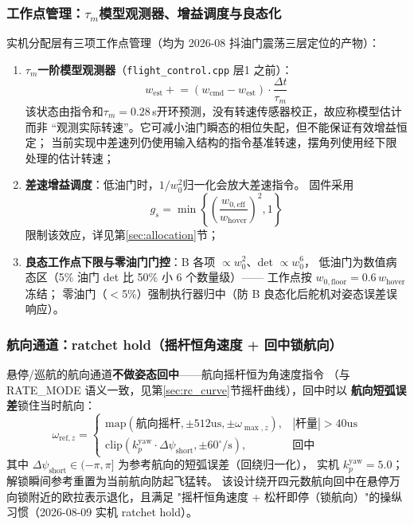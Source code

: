 \subsubsection{工作点管理：$\tau_m$模型观测器、增益调度与良态化}
\label{sec:cascade_workpoint}

实机分配层有三项工作点管理（均为 2026-08 抖油门震荡三层定位的产物）：
\begin{enumerate}[label=(\arabic*)]
    \item \textbf{$\tau_m$一阶模型观测器}（\texttt{flight\_control.cpp} 层1 之前）：
          \begin{equation}
              w_{\mathrm{est}} \mathrel{+}=
              (w_{\mathrm{cmd}} - w_{\mathrm{est}})\cdot\frac{\Delta t}{\tau_m}
              \label{eq:cascade_obs}
          \end{equation}
          该状态由指令和$\tau_m=0.28$\,s开环预测，没有转速传感器校正，故应称模型估计而非
          “观测实际转速”。它可减小油门瞬态的相位失配，但不能保证有效增益恒定；
          当前实现中差速列仍使用输入结构的指令基准转速，摆角列使用经下限处理的估计转速；
    \item \textbf{差速增益调度}：低油门时，$1/w_0^2$归一化会放大差速指令。
          固件采用
          \begin{equation}
              g_s=\min\!\left\{\left(\frac{w_{0,\mathrm{eff}}}
              {w_{\mathrm{hover}}}\right)^2,1\right\}
          \end{equation}
          限制该效应，详见第\ref{sec:allocation}节；
    \item \textbf{良态工作点下限与零油门门控}：B 各项 $\propto w_0^2$、det $\propto w_0^6$，
          低油门为数值病态区（5\% 油门 det 比 50\% 小 6 个数量级）——
          工作点按 $w_{0,\mathrm{floor}}=0.6\,w_{\mathrm{hover}}$ 冻结；
          零油门（$<$5\%）强制执行器归中（防 B 良态化后舵机对姿态误差误响应）。
\end{enumerate}

\subsubsection{航向通道：ratchet hold（摇杆恒角速度 + 回中锁航向）}
\label{sec:cascade_yaw}

悬停/巡航的航向通道\textbf{不做姿态回中}——航向摇杆恒为角速度指令
（与 RATE\_MODE 语义一致，见第\ref{sec:rc_curve}节摇杆曲线），回中时以
\textbf{航向短弧误差}锁住当时航向：
\begin{equation}
    \omega_{\mathrm{ref},z} =
    \begin{cases}
        \mathrm{map}(\text{航向摇杆}, \pm512\text{us}, \pm\omega_{\max,z}), & |\text{杆量}| > 40\text{us} \\
        \mathrm{clip}\!\left(k_p^{\mathrm{yaw}}\cdot\Delta\psi_{\mathrm{short}}, \pm 60^\circ/\mathrm{s}\right), & \text{回中}
    \end{cases}
    \label{eq:cascade_yaw_hold}
\end{equation}
其中 $\Delta\psi_{\mathrm{short}}\in(-\pi,\pi]$ 为参考航向的短弧误差（回绕归一化），
实机 $k_p^{\mathrm{yaw}}=5.0$；解锁瞬间参考重置为当前航向防起飞猛转。
该设计绕开四元数航向回中在悬停万向锁附近的欧拉表示退化，且满足
"摇杆恒角速度 + 松杆即停（锁航向）"的操纵习惯（2026-08-09 实机 ratchet hold）。

